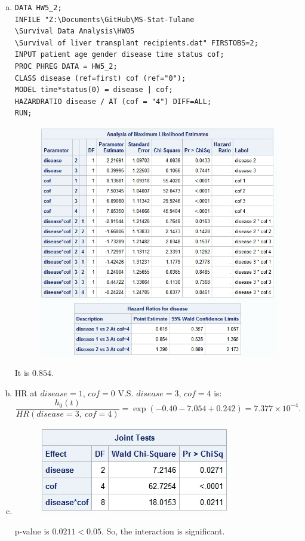 \documentclass[12pt]{elegantbook}
\begin{document}
    \begin{solution}
        \begin{enumerate}[(a)]
            \item \begin{verbatim}
DATA HW5_2; 
INFILE "Z:\Documents\GitHub\MS-Stat-Tulane
\Survival Data Analysis\HW05
\Survival of liver transplant recipients.dat" FIRSTOBS=2; 
INPUT patient age gender disease time status cof;
PROC PHREG DATA = HW5_2;
CLASS disease (ref=first) cof (ref="0");
MODEL time*status(0) = disease | cof;
HAZARDRATIO disease / AT (cof = "4") DIFF=ALL;
RUN;
            \end{verbatim}
            \begin{figure}[H]
                \centering
                \includegraphics[width=.6\textwidth]{HW5_2_1.png}
            \end{figure}
            It is $0.854$. 
            \item HR at $disease=1$, $cof=0$ V.S. $disease=3$, $cof=4$ is: 
            \[
                \frac{h_0(t)}{HR(disease=3,\ cof=4)}=\exp(-0.40-7.054+0.242)=7.377\times10^{-4}. 
            \]
            \item \begin{figure}[H]
                \centering
                \includegraphics[width=.35\textwidth]{HW5_2_2.png}
            \end{figure}
            p-value is $0.0211<0.05$. So, the interaction is significant.
        \end{enumerate}
    \end{solution}
\end{document}
